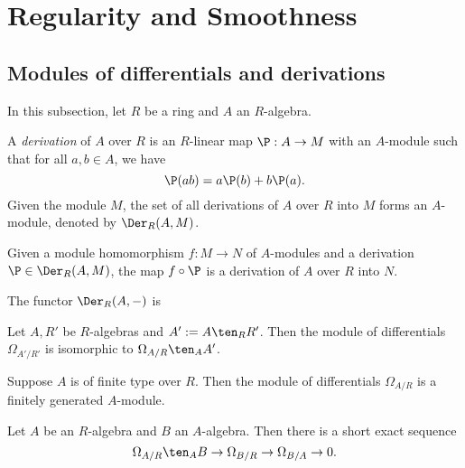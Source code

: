 \section{Regularity and Smoothness}

\subsection{Modules of differentials and derivations}

    In this subsection, let $R$ be a ring and $A$ an $R$-algebra.

    \begin{definition}[Derivation]\label{def: derivation}
        A \emph{derivation} of $A$ over $R$ is an $R$-linear map $\P: A \to M$ with an $A$-module such that for all $a, b \in A$, we have
        \[
            \P(ab) = a\P(b) + b\P(a).
        \]
        Given the module $M$, the set of all derivations of $A$ over $R$ into $M$ forms an \(A\)-module, denoted by $\Der_R(A, M)$.
    \end{definition}

    Given a module homomorphism \(f: M \to N\) of \(A\)-modules and a derivation \(\P \in \Der_R(A, M)\), the map $f \circ \P$ is a derivation of \(A\) over \(R\) into \(N\).

    \begin{proposition}\label{prop: module of differentials}
        The functor \(\Der_R(A, -)\) is 
    \end{proposition}

    \begin{proposition}\label{prop: module of differentials is stable under base change}
        Let \(A, R'\) be \(R\)-algebras and \(A':= A\ten_R R'\).
        Then the module of differentials \(\Omega_{A'/R'}\) is isomorphic to \(\Omega_{A/R} \ten_A A'\).
    \end{proposition}

    \begin{proposition}\label{prop: module of differentials is finite}
        Suppose \(A\) is of finite type over \(R\).
        Then the module of differentials \(\Omega_{A/R}\) is a finitely generated \(A\)-module.
    \end{proposition}

    \begin{theorem}\label{thm: the first exact sequence of differentials}
        Let \(A\) be an \(R\)-algebra and \(B\) an \(A\)-algebra. 
        Then there is a short exact sequence
        \[ \Omega_{A/R} \ten_A B \to \Omega_{B/R} \to \Omega_{B/A} \to 0. \]
    \end{theorem}

